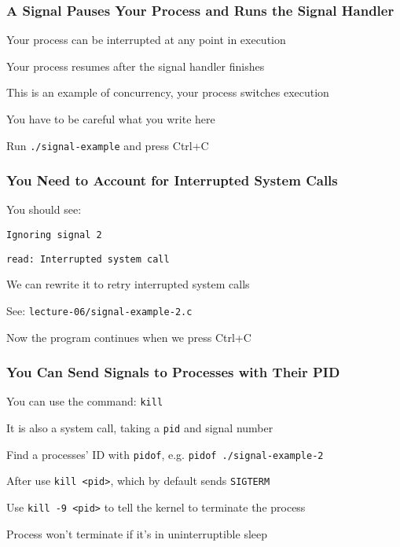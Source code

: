   \begin{frame}
    \frametitle{A Signal Pauses Your Process and Runs the Signal Handler}

    Your process can be interrupted at any point in execution

    \hspace{2em} Your process resumes after the signal handler finishes

    \vspace{2em}

    This is an example of concurrency, your process switches execution

    \hspace{2em} You have to be careful what you write here

    \vspace{2em}

    Run \texttt{./signal-example} and press Ctrl+C
  \end{frame}

  \begin{frame}
    \frametitle{You Need to Account for Interrupted System Calls}

    You should see:

    \hspace{2em} \texttt{Ignoring signal 2}

    \hspace{2em} \texttt{read: Interrupted system call}

    \vspace{2em}

    We can rewrite it to retry interrupted system calls

    \hspace{2em} See: \texttt{lecture-06/signal-example-2.c}

    \vspace{2em}

    Now the program continues when we press Ctrl+C
  \end{frame}

  \begin{frame}
    \frametitle{You Can Send Signals to Processes with Their PID}

    You can use the command: \texttt{kill}

    \hspace{2em} It is also a system call, taking a \texttt{pid} and signal number

    \vspace{2em}

    Find a processes' ID with \texttt{pidof}, e.g. \texttt{pidof ./signal-example-2}

    \vspace{2em}

    After use \texttt{kill <pid>}, which by default sends \texttt{SIGTERM}

    \vspace{2em}

    Use \texttt{kill -9 <pid>} to tell the kernel to terminate the process

    \hspace{2em} Process won't terminate if it's in uninterruptible sleep
  \end{frame}

